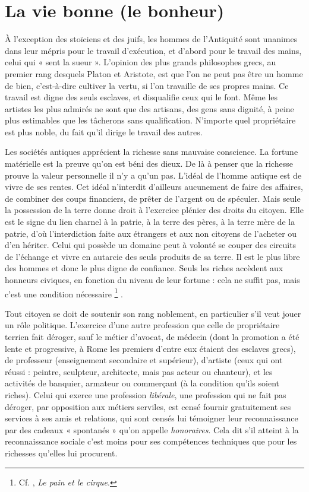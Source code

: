 \section{La vie bonne (le bonheur)}

 À l'exception des stoïciens et des juifs, les hommes de l'Antiquité sont unanimes dans leur mépris pour le travail d'exécution, et d'abord pour le travail des mains, celui qui « sent la sueur ». L'opinion des plus grands philosophes grecs, au premier rang desquels Platon et Aristote, est que l'on ne peut pas être un homme de bien, c'est-à-dire cultiver la vertu, si l'on travaille de ses propres mains. Ce travail est digne des seuls esclaves, et disqualifie ceux qui le font. Même les artistes les plus admirés ne sont que des artisans, des gens sans dignité, à peine plus estimables que les tâcherons sans qualification. N'importe quel propriétaire est plus noble, du fait qu'il dirige le travail des autres.

 Les sociétés antiques apprécient la richesse sans mauvaise conscience. La fortune matérielle est la preuve qu'on est béni des dieux. De là à penser que la richesse prouve la valeur personnelle il n'y a qu'un pas. L'idéal de l'homme antique est de vivre de ses rentes. Cet idéal n'interdit d'ailleurs aucunement de faire des affaires, de combiner des coups financiers, de prêter de l'argent ou de spéculer. Mais seule la possession de la terre donne droit à l'exercice plénier des droits du citoyen. Elle est le signe du lien charnel à la patrie, à la terre des pères, à la terre mère de la patrie, d'où l'interdiction faite aux étrangers et aux non citoyens de l'acheter ou d'en hériter. Celui qui possède un domaine peut à volonté se couper des circuits de l'échange et vivre en autarcie des seuls produits de sa terre. Il est le plus libre des hommes et donc le plus digne de confiance. Seuls les riches accèdent aux honneurs civiques, en fonction du niveau de leur fortune : cela ne suffit pas, mais c'est une condition nécessaire%
\footnote{Cf. , \emph{Le pain et le cirque}.}%
.

 Tout citoyen se doit de soutenir son rang noblement, en particulier s'il veut jouer un rôle politique. L'exercice d'une autre profession que celle de propriétaire terrien fait déroger, sauf le métier d'avocat, de médecin (dont la promotion a été lente et progressive, à Rome les premiers d'entre eux étaient des esclaves grecs), de professeur (enseignement secondaire et supérieur), d'artiste (ceux qui ont réussi : peintre, sculpteur, architecte, mais pas acteur ou chanteur), et les activités de banquier, armateur ou commerçant (à la condition qu'ils soient riches). Celui qui exerce une profession \emph{libérale}, une profession qui ne fait pas déroger, par opposition aux métiers serviles, est censé fournir gratuitement ses services à ses amis et relations, qui sont censés lui témoigner leur reconnaissance par des cadeaux « spontanés » qu'on appelle \emph{honoraires}. Cela dit s'il atteint à la reconnaissance sociale c'est moins pour ses compétences techniques que pour les richesses qu'elles lui procurent. 

